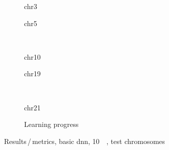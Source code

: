 \begin{figure}[p]
    \begin{subfigure}{0.45\textwidth}
        \scriptsize
        \caption{chr3}
    \end{subfigure} \hfill
    \begin{subfigure}{0.45\textwidth}
        \scriptsize
        \caption{chr5}
    \end{subfigure}\\[5mm]
    \begin{subfigure}{0.45\textwidth}
        \scriptsize
        \caption{chr10}
    \end{subfigure}\hfill
    \begin{subfigure}{0.45\textwidth}
        \scriptsize
        \caption{chr19}
    \end{subfigure}\\[3mm]
    \centering
    \begin{subfigure}{0.45\textwidth}
        \scriptsize
        \caption{chr21}
    \end{subfigure}\hfill
     \begin{subfigure}{0.45\textwidth}
        \caption{Learning progress}\label{fig:results:basicDNN_lossEpochs_10}
    \end{subfigure}
    \caption{Results\,/\,metrics, basic \acrshort{dnn}, \SI{10}{\kilo\bp}, test chromosomes}
    \label{fig:results:basicDNN_10k_pearson}
\end{figure}
